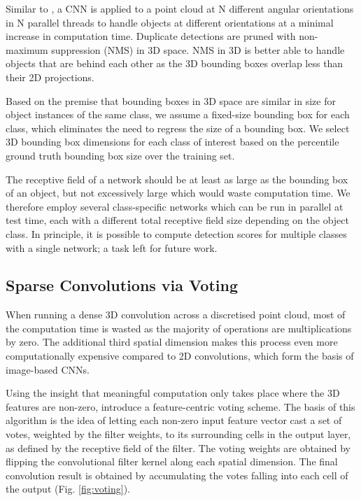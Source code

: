 \documentclass[letterpaper, 10 pt, conference]{tex_style/ieeeconf}
\begin{document}
Similar to \cite{wang2015voting}, a CNN is applied to a point cloud at N different angular orientations in N parallel threads to handle objects at different orientations at a minimal increase in computation time.
Duplicate detections are pruned with non-maximum suppression (NMS) in 3D space.
NMS in 3D is better able to handle objects that are behind each other as the 3D bounding boxes overlap less than their 2D projections.

Based on the premise that bounding boxes in 3D space are similar in size for object instances of the same class, we assume a fixed-size bounding box for each class, which eliminates the need to regress the size of a bounding box.
We select 3D bounding box dimensions for each class of interest based on the  percentile ground truth bounding box size over the training set.

The receptive field of a network should be at least as large as the bounding box of an object, but not excessively large which would waste computation time.
We therefore employ several class-specific networks which can be run in parallel at test time, each with a different total receptive field size depending on the object class.
In principle, it is possible to compute detection scores for multiple classes with a single network; a task left for future work.


\subsection{Sparse Convolutions via Voting}
When running a dense 3D convolution across a discretised point cloud, most of the computation time is wasted as the majority of operations are multiplications by zero.
The additional third spatial dimension makes this process even more computationally expensive compared to 2D convolutions, which form the basis of image-based CNNs.

Using the insight that meaningful computation only takes place where the 3D features are non-zero, \cite{wang2015voting} introduce a feature-centric voting scheme.
The basis of this algorithm is the idea of letting each non-zero input feature vector cast a set of votes, weighted by the filter weights, to its surrounding cells in the output layer, as defined by the receptive field of the filter.
The voting weights are obtained by flipping the convolutional filter kernel along each spatial dimension. The final convolution result is obtained by accumulating the votes falling into each cell of the output (Fig. \ref{fig:voting}).
\end{document}
